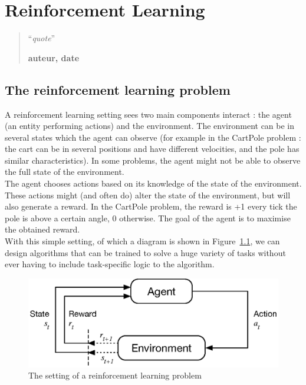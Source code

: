 \chapter{Reinforcement Learning}
\begin{quotation}
\noindent ``\emph{quote}''
\begin{flushright}\textbf{auteur, date}\end{flushright}
\end{quotation}

\vspace*{0.5cm}


\section{The reinforcement learning problem}
A reinforcement learning setting sees two main components interact : the agent
(an entity performing actions)
and the environment. The environment can be in several states which the agent
can observe (for example in the CartPole problem : the cart can be in several 
positions and have different velocities, and the pole has similar 
characteristics). In some problems, the agent might not be able to observe the
full state of the environment.\\

The agent chooses actions based on its knowledge of the state of the
environment. These actions might (and often do) alter the state of the
environment, but will also generate a reward. In the CartPole problem, the 
reward is +1 every tick the pole is above a certain angle, 0 otherwise. The
goal of the agent is to maximise the obtained reward.\\

With this simple setting, of which a diagram is shown in Figure~\ref{fig:rl},
we can design algorithms that can be trained to solve a huge variety of tasks
without ever having to include task-specific logic to the algorithm.

\begin{figure}[]
	\centering
	\includegraphics[width=0.65\linewidth]{fig/rl.eps}
	\caption{The setting of a reinforcement learning problem 
		\cite{suttonbarto}}
	\label{fig:rl}
\end{figure}

